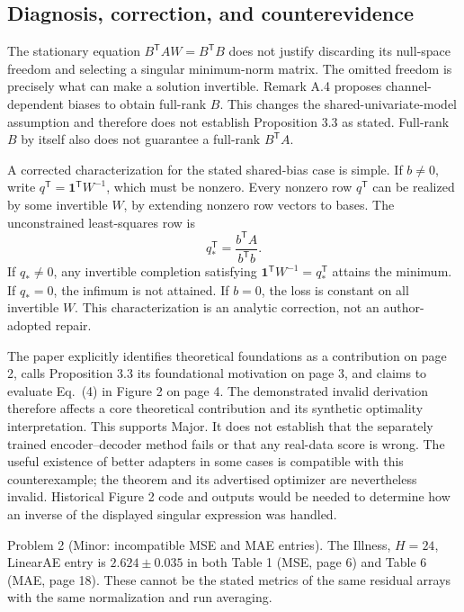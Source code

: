 \documentclass[10pt]{article}
\begin{document}
\subsection*{Diagnosis, correction, and counterevidence}
The stationary equation \(B^{\mathsf T}AW=B^{\mathsf T}B\) does not justify discarding its null-space freedom and selecting a singular minimum-norm matrix. The omitted freedom is precisely what can make a solution invertible. Remark A.4 proposes channel-dependent biases to obtain full-rank \(B\). This changes the shared-univariate-model assumption and therefore does not establish Proposition 3.3 as stated. Full-rank \(B\) by itself also does not guarantee a full-rank \(B^{\mathsf T}A\).\par
A corrected characterization for the stated shared-bias case is simple. If \(b\ne0\), write \(q^{\mathsf T}=\mathbf1^{\mathsf T}W^{-1}\), which must be nonzero. Every nonzero row \(q^{\mathsf T}\) can be realized by some invertible \(W\), by extending nonzero row vectors to bases. The unconstrained least-squares row is \[q_*^{\mathsf T}=\frac{b^{\mathsf T}A}{b^{\mathsf T}b}.\] If \(q_*\ne0\), any invertible completion satisfying \(\mathbf1^{\mathsf T}W^{-1}=q_*^{\mathsf T}\) attains the minimum. If \(q_*=0\), the infimum is not attained. If \(b=0\), the loss is constant on all invertible \(W\). This characterization is an analytic correction, not an author-adopted repair.\par
The paper explicitly identifies theoretical foundations as a contribution on page 2, calls Proposition 3.3 its foundational motivation on page 3, and claims to evaluate Eq. (4) in Figure 2 on page 4. The demonstrated invalid derivation therefore affects a core theoretical contribution and its synthetic optimality interpretation. This supports Major. It does not establish that the separately trained encoder–decoder method fails or that any real-data score is wrong. The useful existence of better adapters in some cases is compatible with this counterexample; the theorem and its advertised optimizer are nevertheless invalid. Historical Figure 2 code and outputs would be needed to determine how an inverse of the displayed singular expression was handled.\par
Problem 2 (Minor: incompatible MSE and MAE entries).  The Illness, \(H=24\), LinearAE entry is \(2.624\pm0.035\) in both Table 1 (MSE, page 6) and Table 6 (MAE, page 18). These cannot be the stated metrics of the same residual arrays with the same normalization and run averaging.\par
\end{document}
